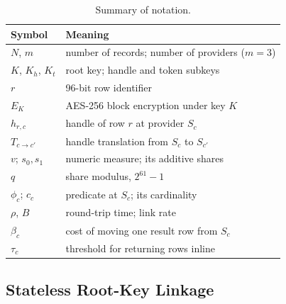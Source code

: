\documentclass[conference]{IEEEtran}
\begin{document}
\begin{table}[t]
\centering
\caption{Summary of notation.}
\label{tab:notation}
\scriptsize
\begin{tabular}{@{}ll@{}}
\toprule
Symbol & Meaning\\
\midrule
$N$, $m$ & number of records; number of providers ($m=3$)\\
$K$, $K_h$, $K_t$ & root key; handle and token subkeys\\
$r$ & 96-bit row identifier\\
$E_K$ & AES-256 block encryption under key $K$\\
$h_{r,c}$ & handle of row $r$ at provider $S_c$\\
$T_{c\to c'}$ & handle translation from $S_c$ to $S_{c'}$\\
$v$; $s_0,s_1$ & numeric measure; its additive shares\\
$q$ & share modulus, $2^{61}-1$\\
$\phi_c$; $c_c$ & predicate at $S_c$; its cardinality\\
$\rho$, $B$ & round-trip time; link rate\\
$\beta_c$ & cost of moving one result row from $S_c$\\
$\tau_c$ & threshold for returning rows inline\\
\bottomrule
\end{tabular}
\end{table}

\subsection{Stateless Root-Key Linkage}\label{sec:c1}
\end{document}
